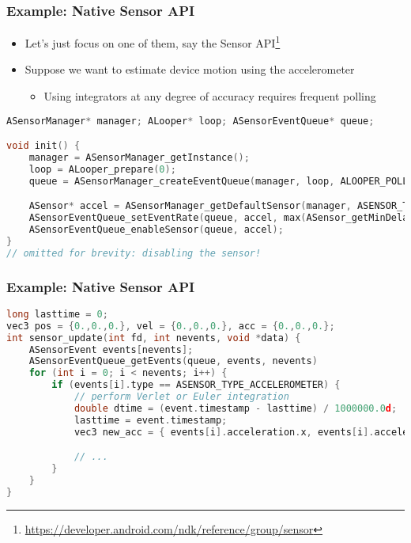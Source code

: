 \documentclass[10pt,mathserif]{beamer}
\begin{document}
	\begin{frame}[fragile]
		\frametitle{Example: Native Sensor API}

		\begin{itemize}
			\item Let's just focus on one of them, say the Sensor API\footnote{\href{https://developer.android.com/ndk/reference/group/sensor}{https://developer.android.com/ndk/reference/group/sensor}}
			\item Suppose we want to estimate device motion using the accelerometer
			\begin{itemize}
				\item Using integrators at any degree of accuracy requires frequent polling
			\end{itemize}
		\end{itemize}

		\begin{lstlisting}[language=c]
ASensorManager* manager; ALooper* loop; ASensorEventQueue* queue;

void init() {
	manager = ASensorManager_getInstance();
	loop = ALooper_prepare(0);
	queue = ASensorManager_createEventQueue(manager, loop, ALOOPER_POLL_CALLBACK, sensor_update, NULL);

	ASensor* accel = ASensorManager_getDefaultSensor(manager, ASENSOR_TYPE_ACCELEROMETER);
	ASensorEventQueue_setEventRate(queue, accel, max(ASensor_getMinDelay(accel), 500));  // 500 us min
	ASensorEventQueue_enableSensor(queue, accel);
}
// omitted for brevity: disabling the sensor!
		\end{lstlisting}
	\end{frame}


	\begin{frame}[fragile]
		\frametitle{Example: Native Sensor API}

		\begin{lstlisting}[language=c]
long lasttime = 0;
vec3 pos = {0.,0.,0.}, vel = {0.,0.,0.}, acc = {0.,0.,0.};
int sensor_update(int fd, int nevents, void *data) {
	ASensorEvent events[nevents];
	ASensorEventQueue_getEvents(queue, events, nevents)
	for (int i = 0; i < nevents; i++) {
		if (events[i].type == ASENSOR_TYPE_ACCELEROMETER) {
			// perform Verlet or Euler integration
			double dtime = (event.timestamp - lasttime) / 1000000.0d;
			lasttime = event.timestamp;
			vec3 new_acc = { events[i].acceleration.x, events[i].acceleration.y, events[i].acceleration.z };

			// ...
		}
	}
}
		\end{lstlisting}
	\end{frame}
\end{document}
